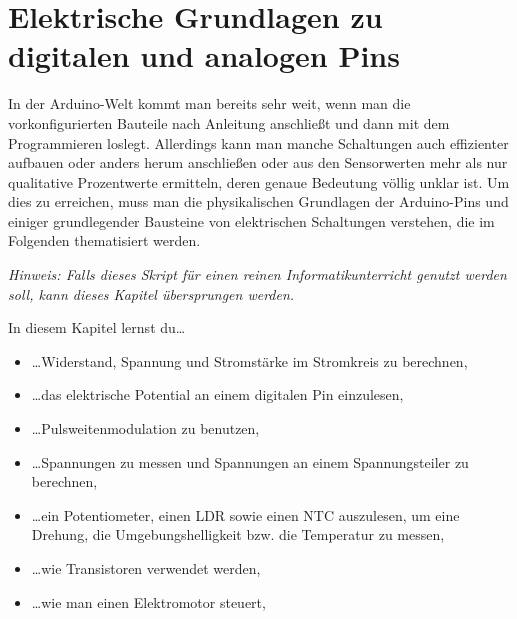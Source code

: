 \pagecolor{CadetBlue!70!green}
\chapter{Elektrische Grundlagen zu digitalen und analogen Pins}
\label{kap:elektrischegrundlagen}

In der Arduino-Welt kommt man bereits sehr weit, wenn man die vorkonfigurierten Bauteile nach Anleitung anschließt und dann mit dem Programmieren loslegt. Allerdings kann man manche Schaltungen auch effizienter aufbauen oder anders herum anschließen oder aus den Sensorwerten mehr als nur qualitative Prozentwerte ermitteln, deren genaue Bedeutung völlig unklar ist. Um dies zu erreichen, muss man die physikalischen Grundlagen der Arduino-Pins und einiger grundlegender Bausteine von elektrischen Schaltungen verstehen, die im Folgenden thematisiert werden.

\medskip
\emph{Hinweis: Falls dieses Skript für einen reinen Informatikunterricht genutzt werden soll, kann dieses Kapitel übersprungen werden.}  

\bigskip
In diesem Kapitel lernst du\dots
\begin{itemize}
	\item \dots Widerstand, Spannung und Stromstärke im Stromkreis zu berechnen,
	\item \dots das elektrische Potential an einem digitalen Pin einzulesen,
	\item \dots Pulsweitenmodulation zu benutzen,
	\item \dots Spannungen zu messen und Spannungen an einem Spannungsteiler zu berechnen,
	\item \dots ein Potentiometer, einen LDR sowie einen NTC auszulesen, um eine Drehung, die Umgebungshelligkeit bzw. die Temperatur zu messen,
	\item \dots wie Transistoren verwendet werden,
	\item \dots wie man einen Elektromotor steuert,
\end{itemize}

\bigskip

\bigskip

